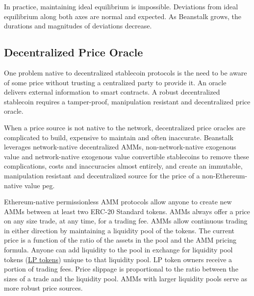 \documentclass[tikz]{article}
\begin{document}
In practice, maintaining ideal equilibrium is impossible. Deviations from ideal equilibrium along both axes are normal and expected. As Beanstalk grows, the durations and magnitudes of deviations decrease. 

\vspace*{-1mm}
\subsection{Decentralized Price Oracle}
\vspace*{-1mm}

One problem native to decentralized stablecoin protocols is the need to be aware of some price without trusting a centralized party to provide it. An oracle delivers external information to smart contracts. A robust decentralized stablecoin requires a tamper-proof, manipulation resistant and decentralized price oracle.

When a price source is not native to the network, decentralized price oracles are complicated to build, expensive to maintain and often inaccurate. Beanstalk leverages network-native decentralized AMMs, non-network-native exogenous value and network-native exogenous value convertible stablecoins to remove these complications, costs and inaccuracies almost entirely, and create an immutable, manipulation resistant and decentralized source for the price of a non-Ethereum-native value peg.

Ethereum-native permissionless AMM protocols allow anyone to create new AMMs between at least two ERC-20 Standard tokens. AMMs always offer a price on any size trade, at any time, for a trading fee. AMMs allow continuous trading in either direction by maintaining a liquidity pool of the tokens. The current price is a function of the ratio of the assets in the pool and the AMM pricing formula. Anyone can add liquidity to the pool in exchange for liquidity pool tokens (\hyperlink{LP tokens}{LP tokens}) unique to that liquidity pool. LP token owners receive a portion of trading fees. Price slippage is proportional to the ratio between the sizes of a trade and the liquidity pool. AMMs with larger liquidity pools serve as more robust price sources.
\end{document}
